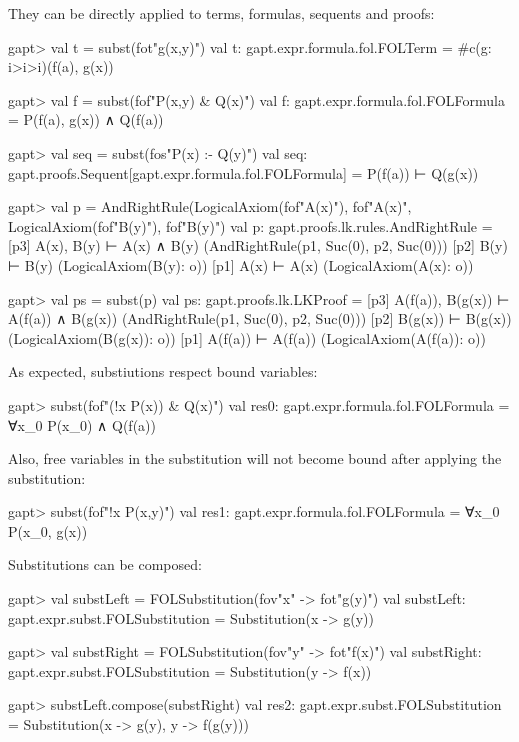 \documentclass[a4paper,11pt]{book}
\begin{document}
They can be directly applied to terms, formulas, sequents and proofs:
\begin{clilisting}
gapt> val t = subst(fot"g(x,y)")
val t: gapt.expr.formula.fol.FOLTerm = #c(g: i>i>i)(f(a), g(x))

gapt> val f = subst(fof"P(x,y) & Q(x)")
val f: gapt.expr.formula.fol.FOLFormula = P(f(a), g(x)) ∧ Q(f(a))

gapt> val seq = subst(fos"P(x) :- Q(y)")
val seq: gapt.proofs.Sequent[gapt.expr.formula.fol.FOLFormula] = P(f(a)) ⊢ Q(g(x))

gapt> val p = AndRightRule(LogicalAxiom(fof"A(x)"), fof"A(x)", LogicalAxiom(fof"B(y)"), fof"B(y)")
val p: gapt.proofs.lk.rules.AndRightRule = [p3] A(x), B(y) ⊢ A(x) ∧ B(y)    (AndRightRule(p1, Suc(0), p2, Suc(0)))
[p2] B(y) ⊢ B(y)    (LogicalAxiom(B(y): o))
[p1] A(x) ⊢ A(x)    (LogicalAxiom(A(x): o))

gapt> val ps = subst(p)
val ps: gapt.proofs.lk.LKProof = [p3] A(f(a)), B(g(x)) ⊢ A(f(a)) ∧ B(g(x))    (AndRightRule(p1, Suc(0), p2, Suc(0)))
[p2] B(g(x)) ⊢ B(g(x))    (LogicalAxiom(B(g(x)): o))
[p1] A(f(a)) ⊢ A(f(a))    (LogicalAxiom(A(f(a)): o))

\end{clilisting}

As expected, substiutions respect bound variables:
\begin{clilisting}
gapt> subst(fof"(!x P(x)) & Q(x)")
val res0: gapt.expr.formula.fol.FOLFormula = ∀x_0 P(x_0) ∧ Q(f(a))

\end{clilisting}

Also, free variables in the substitution will not become bound after applying the substitution:
\begin{clilisting}
gapt> subst(fof"!x P(x,y)")
val res1: gapt.expr.formula.fol.FOLFormula = ∀x_0 P(x_0, g(x))

\end{clilisting}

Substitutions can be composed:
\begin{clilisting}
gapt> val substLeft = FOLSubstitution(fov"x" -> fot"g(y)")
val substLeft: gapt.expr.subst.FOLSubstitution = Substitution(x -> g(y))

gapt> val substRight = FOLSubstitution(fov"y" -> fot"f(x)")
val substRight: gapt.expr.subst.FOLSubstitution = Substitution(y -> f(x))

gapt> substLeft.compose(substRight)
val res2: gapt.expr.subst.FOLSubstitution = Substitution(x -> g(y), y -> f(g(y)))

\end{clilisting}
\end{document}
